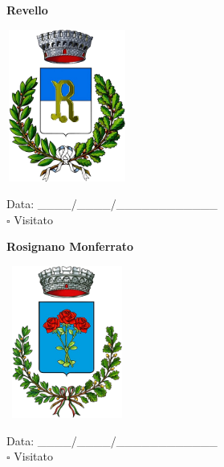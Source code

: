 \documentclass[a5paper,12pt]{article}
\begin{document}
\vspace{0.7cm}

\noindent
\begin{minipage}[t]{0.45\textwidth}
    \begin{center}
        \textbf{Revello}
    \end{center}
    \vspace{-0.5cm} %
    \begin{center}
        \includegraphics[height= 5cm, width=4cm]{Piemonte/Stemma Revello.png}
    \end{center}
    \vspace{-0.4cm} %
    \begin{flushleft}
        Data: \_\_\_\_/\_\_\_\_/\_\_\_\_\_\_\_\_\_\_\_\_ \\
        $\square$ Visitato
    \end{flushleft}
\end{minipage}
\hfill
\noindent
\begin{minipage}[t]{0.45\textwidth}
    \begin{center}
        \textbf{Rosignano Monferrato}
    \end{center}
    \vspace{-0.5cm} %
    \begin{center}
        \includegraphics[height= 5cm, width=4cm]{Piemonte/Stemma Rosignano Monferrato.png}
    \end{center}
    \vspace{-0.4cm} %
    \begin{flushleft}
        Data: \_\_\_\_/\_\_\_\_/\_\_\_\_\_\_\_\_\_\_\_\_ \\
        $\square$ Visitato
    \end{flushleft}
\end{minipage}
\end{document}
